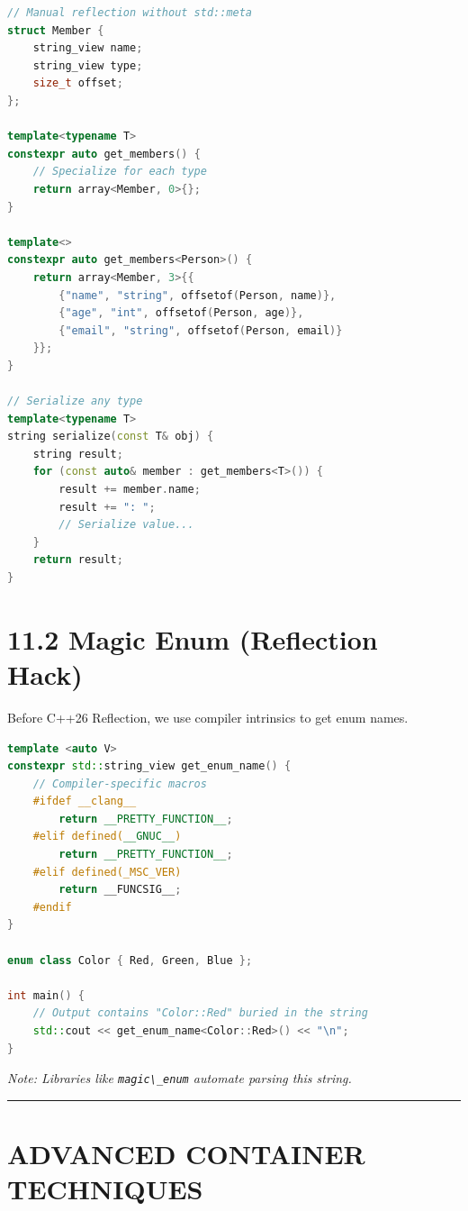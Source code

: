 \begin{lstlisting}[language={C++}]
// Manual reflection without std::meta
struct Member {
    string_view name;
    string_view type;
    size_t offset;
};

template<typename T>
constexpr auto get_members() {
    // Specialize for each type
    return array<Member, 0>{};
}

template<>
constexpr auto get_members<Person>() {
    return array<Member, 3>{{
        {"name", "string", offsetof(Person, name)},
        {"age", "int", offsetof(Person, age)},
        {"email", "string", offsetof(Person, email)}
    }};
}

// Serialize any type
template<typename T>
string serialize(const T& obj) {
    string result;
    for (const auto& member : get_members<T>()) {
        result += member.name;
        result += ": ";
        // Serialize value...
    }
    return result;
}
\end{lstlisting}

\hypertarget{magic-enum-reflection-hack}{%
\section{11.2 Magic Enum (Reflection
Hack)}\label{magic-enum-reflection-hack}}

Before C++26 Reflection, we use compiler intrinsics to get enum names.

\begin{lstlisting}[language={C++}]
template <auto V>
constexpr std::string_view get_enum_name() {
    // Compiler-specific macros
    #ifdef __clang__
        return __PRETTY_FUNCTION__;
    #elif defined(__GNUC__)
        return __PRETTY_FUNCTION__;
    #elif defined(_MSC_VER)
        return __FUNCSIG__;
    #endif
}

enum class Color { Red, Green, Blue };

int main() {
    // Output contains "Color::Red" buried in the string
    std::cout << get_enum_name<Color::Red>() << "\n";
}
\end{lstlisting}

\emph{Note: Libraries like \passthrough{\lstinline!magic\_enum!}
automate parsing this string.}

\begin{center}\rule{0.5\linewidth}{0.5pt}\end{center}

\hypertarget{advanced-container-techniques}{%
\section{ADVANCED CONTAINER
TECHNIQUES}\label{advanced-container-techniques}}

